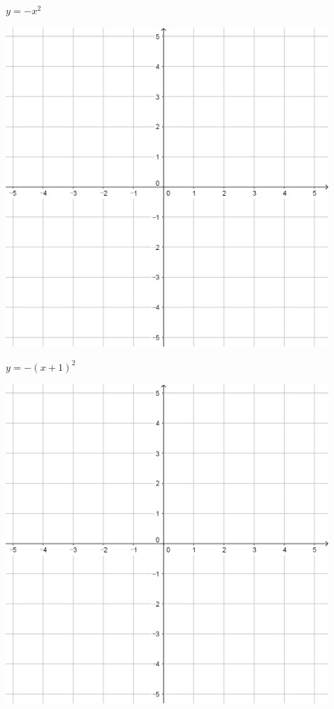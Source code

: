 \documentclass[a4paper]{oblivoir}
\begin{document}
\clearpage
\begin{minipage}{0.45\textwidth}\centering
\(y=-x^2\)
\par\bigskip\includegraphics[width=0.9\textwidth]{55}
\end{minipage}
\begin{minipage}{0.45\textwidth}\centering
\(y=-(x+1)^2\)
\par\bigskip\includegraphics[width=0.9\textwidth]{55}
\end{minipage}\bigskip\bigskip\par
\end{document}
